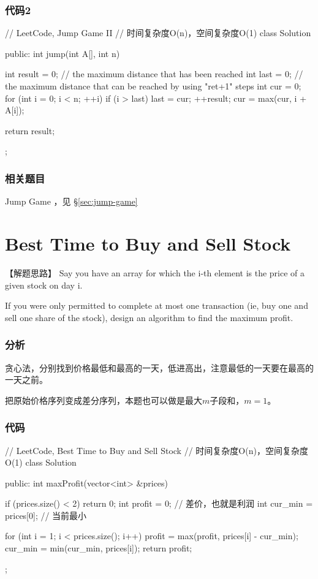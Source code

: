 \subsubsection{代码2}
\begin{Code}
	// LeetCode, Jump Game II
	// 时间复杂度O(n)，空间复杂度O(1)
	class Solution {
		public:
		int jump(int A[], int n) {
			int result = 0;
			// the maximum distance that has been reached
			int last = 0;
			// the maximum distance that can be reached by using "ret+1" steps
			int cur = 0;
			for (int i = 0; i < n; ++i) {
				if (i > last) {
					last = cur;
					++result;
				}
				cur = max(cur, i + A[i]);
			}
			
			return result;
		}
	};
\end{Code}


\subsubsection{相关题目}
\begindot
\item Jump Game ，见 \S \ref{sec:jump-game}
\myenddot


\section{Best Time to Buy and Sell Stock} %
\label{sec:best-time-to-buy-and-sell-stock}


【解题思路】
Say you have an array for which the i-th element is the price of a given stock on day i.

If you were only permitted to complete at    most one transaction (ie, buy one and sell one share of the stock), design an algorithm to find the maximum profit.


\subsubsection{分析}
贪心法，分别找到价格最低和最高的一天，低进高出，注意最低的一天要在最高的一天之前。

把原始价格序列变成差分序列，本题也可以做是最大$m$子段和，$m=1$。

\subsubsection{代码}
\begin{Code}
	// LeetCode, Best Time to Buy and Sell Stock
	// 时间复杂度O(n)，空间复杂度O(1)
	class Solution {
		public:
		int maxProfit(vector<int> &prices) {
			if (prices.size() < 2) return 0;
			int profit = 0;  // 差价，也就是利润
			int cur_min = prices[0]; // 当前最小
			
			for (int i = 1; i < prices.size(); i++) {
				profit = max(profit, prices[i] - cur_min);
				cur_min = min(cur_min, prices[i]);
			}
			return profit;
		}
	};
\end{Code}


